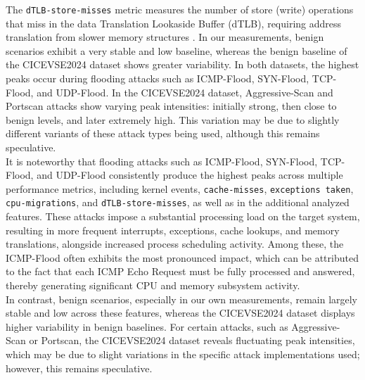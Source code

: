 The \texttt{dTLB-store-misses} metric measures the number of store (write) operations that miss in the data Translation Lookaside Buffer (dTLB), requiring address translation from slower memory structures \cite{dtlbstoremisses_explained}. In our measurements, benign scenarios exhibit a very stable and low baseline, whereas the benign baseline of the CICEVSE2024 dataset shows greater variability. In both datasets, the highest peaks occur during flooding attacks such as ICMP-Flood, SYN-Flood, TCP-Flood, and UDP-Flood. In the CICEVSE2024 dataset, Aggressive-Scan and Portscan attacks show varying peak intensities: initially strong, then close to benign levels, and later extremely high. This variation may be due to slightly different variants of these attack types being used, although this remains speculative.\\

It is noteworthy that flooding attacks such as ICMP-Flood, SYN-Flood, TCP-Flood, and UDP-Flood consistently produce the highest peaks across multiple performance metrics, including kernel events, \texttt{cache-misses}, \texttt{exceptions taken}, \texttt{cpu-migrations}, and \texttt{dTLB-store-misses}, as well as in the additional analyzed features. These attacks impose a substantial processing load on the target system, resulting in more frequent interrupts, exceptions, cache lookups, and memory translations, alongside increased process scheduling activity. Among these, the ICMP-Flood often exhibits the most pronounced impact, which can be attributed to the fact that each ICMP Echo Request must be fully processed and answered, thereby generating significant CPU and memory subsystem activity.\\
In contrast, benign scenarios, especially in our own measurements, remain largely stable and low across these features, whereas the CICEVSE2024 dataset displays higher variability in benign baselines. For certain attacks, such as Aggressive-Scan or Portscan, the CICEVSE2024 dataset reveals fluctuating peak intensities, which may be due to slight variations in the specific attack implementations used; however, this remains speculative.
